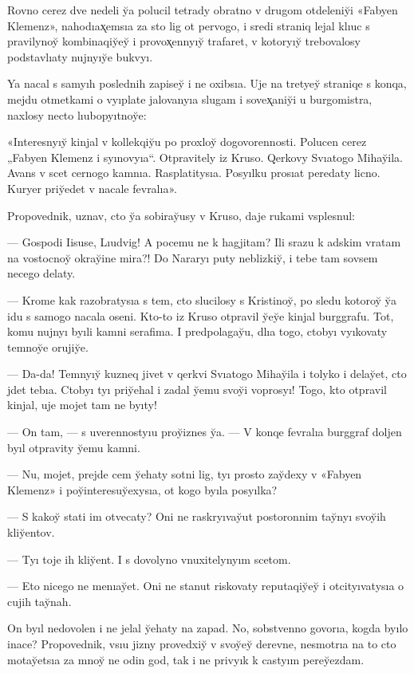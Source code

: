 \documentclass[10pt]{book}
\begin{document}
Rovno cerez dve nedeli y̆a polucil tetrady obratno v drugom otdeleniy̆i «Fabyen Klemenz», nahodıax̨emsıa za sto lig ot pervogo, i sredi straniq lejal klıuc s pravilynoy̆ kombinaqiy̆ey̆ i provox̨ennyıy̆ trafaret, v kotoryıy̆ trebovalosy podstavlıaty nujnyıy̆e bukvyı.

Ya nacal s samyıh poslednih zapisey̆ i ne oxibsıa. Uje na tretyey̆ straniqe s konqa, mejdu otmetkami o vyıplate jalovanyıa slugam i sovex̨aniy̆i u burgomistra, naxlosy necto lıubopyıtnoy̆e:

«Interesnyıy̆ kinjal v kollekqiy̆u po proxloy̆ dogovorennosti. Polucen cerez „Fabyen Klemenz i syınovyıa“. Otpravitely iz Kruso. Qerkovy Svıatogo Mihay̆ila. Avans v scet cernogo kamnıa. Rasplatitysıa. Posyılku prosıat peredaty licno. Kuryer priy̆edet v nacale fevralıa».



Propovednik, uznav, cto y̆a sobiray̆usy v Kruso, daje rukami vsplesnul:

— Gospodi Iisuse, Lıudvig! A pocemu ne k hagjitam? Ili srazu k adskim vratam na vostocnoy̆ okray̆ine mira?! Do Nararyı puty neblizkiy̆, i tebe tam sovsem necego delaty.

— Krome kak razobratysıa s tem, cto slucilosy s Kristinoy̆, po sledu kotoroy̆ y̆a idu s samogo nacala oseni. Kto-to iz Kruso otpravil y̆ey̆e kinjal burggrafu. Tot, komu nujnyı byıli kamni serafima. I predpolagay̆u, dlıa togo, ctobyı vyıkovaty temnoy̆e orujiy̆e.

— Da-da! Temnyıy̆ kuzneq jivet v qerkvi Svıatogo Mihay̆ila i tolyko i delay̆et, cto jdet tebıa. Ctobyı tyı priy̆ehal i zadal y̆emu svoy̆i voprosyı! Togo, kto otpravil kinjal, uje mojet tam ne byıty!

— On tam, — s uverennostyıu proy̆iznes y̆a. — V konqe fevralıa burggraf doljen byıl otpravity y̆emu kamni.

— Nu, mojet, prejde cem y̆ehaty sotni lig, tyı prosto zay̆dexy v «Fabyen Klemenz» i poy̆interesuy̆exysıa, ot kogo byıla posyılka?

— S kakoy̆ stati im otvecaty? Oni ne raskryıvay̆ut postoronnim tay̆nyı svoy̆ih kliy̆entov.

— Tyı toje ih kliy̆ent. I s dovolyno vnuxitelynyım scetom.

— Eto nicego ne menıay̆et. Oni ne stanut riskovaty reputaqiy̆ey̆ i otcityıvatysıa o cujih tay̆nah.

On byıl nedovolen i ne jelal y̆ehaty na zapad. No, sobstvenno govorıa, kogda byılo inace? Propovednik, vsıu jizny provedxiy̆ v svoy̆ey̆ derevne, nesmotrıa na to cto motay̆etsıa za mnoy̆ ne odin god, tak i ne privyık k castyım perey̆ezdam.
\end{document}
